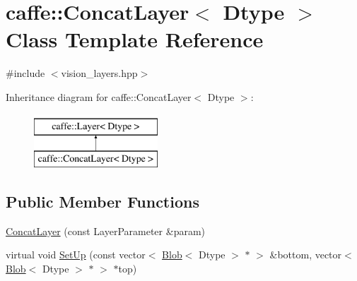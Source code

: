 \hypertarget{classcaffe_1_1_concat_layer}{\section{caffe\+:\+:Concat\+Layer$<$ Dtype $>$ Class Template Reference}
\label{classcaffe_1_1_concat_layer}
}


{\ttfamily \#include $<$vision\+\_\+layers.\+hpp$>$}

Inheritance diagram for caffe\+:\+:Concat\+Layer$<$ Dtype $>$\+:\begin{figure}[H]
\begin{center}
\leavevmode
\includegraphics[height=2.000000cm]{classcaffe_1_1_concat_layer}
\end{center}
\end{figure}
\subsection*{Public Member Functions}
\begin{DoxyCompactItemize}
\item 
\hyperlink{classcaffe_1_1_concat_layer_aa06930bae7ed23c88546f35323e1792d}{Concat\+Layer} (const Layer\+Parameter \&param)
\item 
virtual void \hyperlink{classcaffe_1_1_concat_layer_ad479a513d943035c1415309ed61e62d8}{Set\+Up} (const vector$<$ \hyperlink{classcaffe_1_1_blob}{Blob}$<$ Dtype $>$ $\ast$ $>$ \&bottom, vector$<$ \hyperlink{classcaffe_1_1_blob}{Blob}$<$ Dtype $>$ $\ast$ $>$ $\ast$top)
\end{DoxyCompactItemize}
